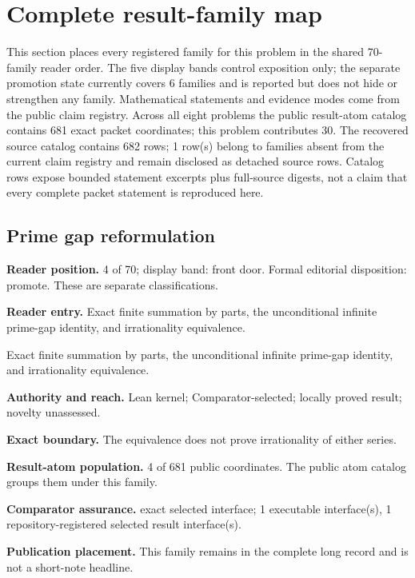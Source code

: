 \documentclass[11pt]{article}
\begin{document}
\clearpage
\section{Complete result-family map}\label{sec:erdos-251-complete-family-map}

This section places every registered family for this problem in the shared 70-family reader order.  The five display bands control exposition only; the separate promotion state currently covers 6 families and is reported but does not hide or strengthen any family.  Mathematical statements and evidence modes come from the public claim registry.  Across all eight problems the public result-atom catalog contains 681 exact packet coordinates; this problem contributes 30.  The recovered source catalog contains 682 rows; 1 row(s) belong to families absent from the current claim registry and remain disclosed as detached source rows.  Catalog rows expose bounded statement excerpts plus full-source digests, not a claim that every complete packet statement is reproduced here.

\subsection{Prime gap reformulation}
\textbf{Reader position.} 4 of 70; display band: front door.  Formal editorial disposition: promote.  These are separate classifications.

\textbf{Reader entry.} Exact finite summation by parts, the unconditional infinite prime-gap identity, and irrationality equivalence.

Exact finite summation by parts, the unconditional infinite prime-gap identity, and irrationality equivalence.

\textbf{Authority and reach.} Lean kernel; Comparator-selected; locally proved result; novelty unassessed.

\textbf{Exact boundary.} The equivalence does not prove irrationality of either series.

\textbf{Result-atom population.} 4 of 681 public coordinates. The public atom catalog groups them under this family.

\textbf{Comparator assurance.} exact selected interface; 1 executable interface(s), 1 repository-registered selected result interface(s).

\textbf{Publication placement.} This family remains in the complete long record and is not a short-note headline.
\end{document}
